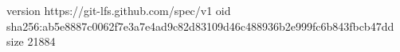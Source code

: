 version https://git-lfs.github.com/spec/v1
oid sha256:ab5e8887c0062f7e3a7e4ad9c82d83109d46c488936b2e999fc6b843fbcb47dd
size 21884
